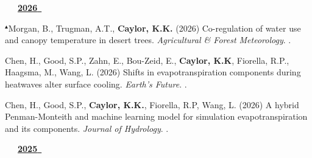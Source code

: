 
                                                                                                        
    

\mbox{\ \ \ \underline{\textbf{2026 }}}

\begin{etaremune}

\item $^{\blacktriangle}$Morgan, B., Trugman, A.T., \textbf{ Caylor, K.K.} (2026) Co-regulation of water use and canopy temperature in desert trees. \emph{Agricultural \& Forest Meteorology}. .
\item Chen, H., Good, S.P., Zahn, E., Bou-Zeid, E., \textbf{ Caylor, K.K}, Fiorella, R.P., Haagsma, M., Wang, L. (2026) Shifts in evapotranspiration components during heatwaves alter surface cooling. \emph{Earth's Future}. .
\item Chen, H., Good, S.P., \textbf{ Caylor, K.K.}, Fiorella, R.P, Wang, L. (2026) A hybrid Penman-Monteith and machine learning model for simulation evapotranspiration and its components. \emph{Journal of Hydrology}. .


\vspace{0.1in}
\mbox{\ \ \ \underline{\textbf{2025 }}}
\vspace{0.1in}


\end{etaremune}
